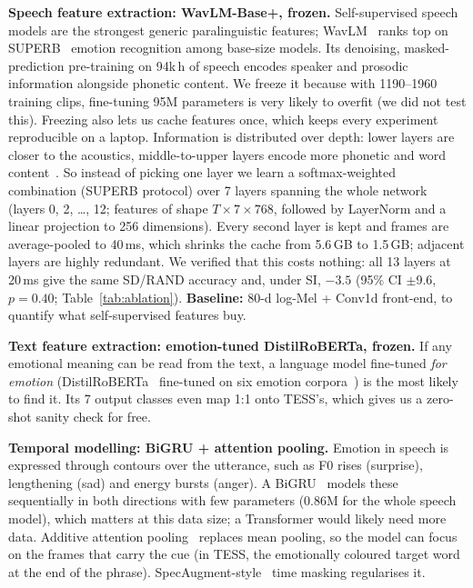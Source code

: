 \textbf{Speech feature extraction: WavLM-Base+, frozen.} Self-supervised speech models are the strongest generic paralinguistic features; WavLM~\cite{wavlm} ranks top on SUPERB~\cite{superb} emotion recognition among base-size models.
Its denoising, masked-prediction pre-training on 94k\,h of speech encodes speaker and prosodic information alongside phonetic content.
We freeze it because with 1190--1960 training clips, fine-tuning 95M parameters is very likely to overfit (we did not test this).
Freezing also lets us cache features once, which keeps every experiment reproducible on a laptop.
Information is distributed over depth: lower layers are closer to the acoustics, middle-to-upper layers encode more phonetic and word content~\cite{pasad}.
So instead of picking one layer we learn a softmax-weighted combination (SUPERB protocol) over 7 layers spanning the whole network (layers 0, 2, \dots, 12; features of shape $T\times7\times768$, followed by LayerNorm and a linear projection to 256 dimensions).
Every second layer is kept and frames are average-pooled to 40\,ms, which shrinks the cache from 5.6\,GB to 1.5\,GB; adjacent layers are highly redundant.
We verified that this costs nothing: all 13 layers at 20\,ms give the same SD/RAND accuracy and, under SI, $-3.5$\pp{} (95\% CI $\pm$9.6, $p=0.40$; Table~\ref{tab:ablation}).
\textbf{Baseline:} 80-d log-Mel + Conv1d front-end, to quantify what self-supervised features buy.

\textbf{Text feature extraction: emotion-tuned DistilRoBERTa, frozen.} If any emotional meaning can be read from the text, a language model fine-tuned \emph{for emotion} (DistilRoBERTa~\cite{distilbert,roberta} fine-tuned on six emotion corpora~\cite{hartmann}) is the most likely to find it.
Its 7 output classes even map 1:1 onto TESS's, which gives us a zero-shot sanity check for free.

\textbf{Temporal modelling: BiGRU + attention pooling.} Emotion in speech is expressed through contours over the utterance, such as F0 rises (surprise), lengthening (sad) and energy bursts (anger).
A BiGRU~\cite{gru} models these sequentially in both directions with few parameters (0.86M for the whole speech model), which matters at this data size; a Transformer would likely need more data.
Additive attention pooling~\cite{bahdanau} replaces mean pooling, so the model can focus on the frames that carry the cue (in TESS, the emotionally coloured target word at the end of the phrase).
SpecAugment-style~\cite{specaugment} time masking regularises it.

